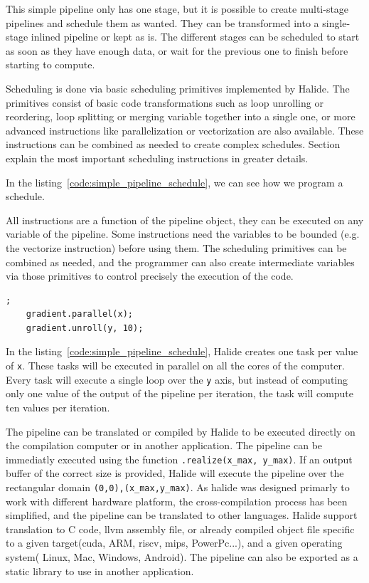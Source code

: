 	This simple pipeline only has one stage, but it is possible to create multi-stage pipelines and schedule them as wanted. They can be transformed into a single-stage inlined pipeline or kept as is.
	The different stages can be scheduled to start as soon as they have enough data, or wait for the previous one to finish before starting to compute.

	Scheduling is done via basic scheduling primitives implemented by Halide.
The primitives consist of basic code transformations such as loop unrolling or reordering, loop splitting or merging variable together into a single one, or more advanced instructions like parallelization or vectorization are also available. These instructions can be combined as needed to create complex schedules.
Section ~ explain the most important scheduling instructions in greater details. 


	In the listing~\ref{code:simple_pipeline_schedule}, we can see how we program a schedule.

	All instructions are a function of the pipeline object, they can be executed on any variable of the  pipeline. Some instructions need the variables to be bounded (e.g. the vectorize instruction) before using them. The scheduling primitives can be combined as needed, and the programmer can also create intermediate variables via those primitives to control precisely the execution of the code.


	\begin{lstlisting}[caption={Simple Pipeline Example}, captionpos=b,label={code:simple_pipeline_schedule}];
	gradient.parallel(x);
	gradient.unroll(y, 10);
	\end{lstlisting}

	In the listing~\ref{code:simple_pipeline_schedule},
 	Halide creates one task per value of \verb|x|. These tasks will be executed in parallel on all the cores of the computer. Every task will execute a single loop over the \verb|y| axis, but instead of computing only one value of the output of the pipeline per iteration, the task will compute ten values per iteration.


	The pipeline can be translated or compiled by Halide to be executed directly on the compilation computer or in another application.
	The pipeline can be immediatly executed using the function \texttt{.realize(x\_max, y\_max)}. If an output buffer of the correct size is provided, Halide will execute the pipeline over the rectangular domain \texttt{(0,0),(x\_max,y\_max)}.
	 As halide was designed primarly to work with different hardware platform, the  cross-compilation process  has been simplified, and the pipeline can be translated to other languages.
	 Halide support translation to C code, \gls{llvm} assembly file, or already compiled object file specific to a given target(\gls{cuda}, ARM, \gls{riscv}, \gls{mips}, PowerPc...), and a given operating system( Linux, Mac, Windows, Android). The pipeline can also be exported as a static library to use in another application.

